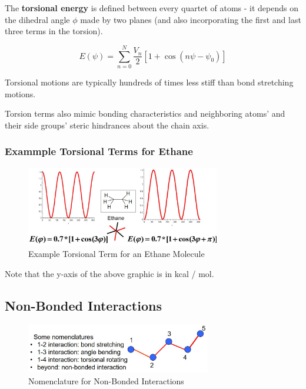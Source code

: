 \documentclass[
  letterpaper,
  DIV=11,
  numbers=noendperiod]{scrreprt}
\begin{document}
The \textbf{torsional energy} is defined between every quartet of atoms
- it depends on the dihedral angle \(\phi\) made by two planes (and also
incorporating the first and last three terms in the torsion).

\begin{equation}
  E(\psi) = \sum_{n = 0}^N\frac{V_n}{2}[1 + \cos(n\psi - \psi_0)]
\end{equation}

Torsional motions are typically hundreds of times less stiff than bond
stretching motions.

Torsion terms also mimic bonding characteristics and neighboring atoms'
and their side groups' steric hindrances about the chain axis.

\hypertarget{exammple-torsional-terms-for-ethane}{%
\subsubsection{Exammple Torsional Terms for
Ethane}\label{exammple-torsional-terms-for-ethane}}

\begin{figure}

{\centering \includegraphics[width=3.33in,height=\textheight]{./images/wk2/ethane.jpg}

}

\caption{Example Torsional Term for an Ethane Molecule}

\end{figure}

Note that the y-axis of the above graphic is in kcal / mol.

\hypertarget{non-bonded-interactions}{%
\subsection{Non-Bonded Interactions}\label{non-bonded-interactions}}

\begin{figure}

{\centering \includegraphics[width=3.18in,height=\textheight]{./images/wk2/nonbond.jpg}

}

\caption{Nomenclature for Non-Bonded Interactions}

\end{figure}
\end{document}
